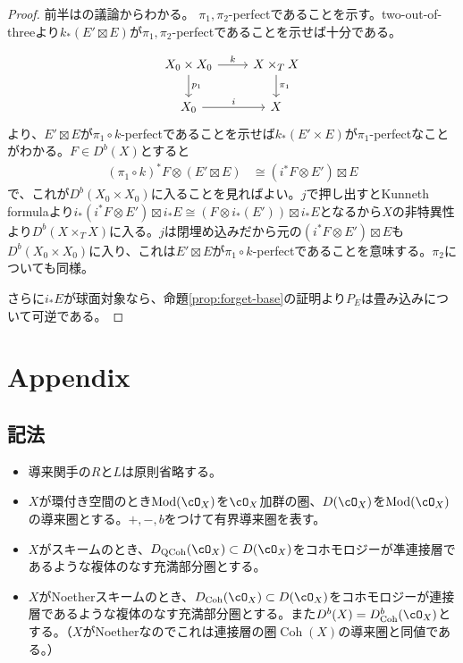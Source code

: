 \documentclass[uplatex, a4paper, dvipdfmx]{jsarticle}
\theoremstyle{definition}
\DeclareMathOperator{\Coh}{\mathrm{Coh}}
\DeclareMathOperator{\QCoh}{\mathrm{QCoh}}
\DeclareMathOperator{\Mod}{\mathrm{Mod}}
\begin{document}
\begin{proof}
    前半は\cite{2023arXiv230212501A}の議論からわかる。
    $\pi_1, \pi_2$-perfectであることを示す。two-out-of-threeより$k_*(E' \boxtimes E)$が$\pi_1, \pi_2$-perfectであることを示せば十分である。

    \[
        \begin{tikzcd}
            X_0 \times X_0 \arrow[r, "k"]\arrow[d, "p_1"] & X \times_T X\arrow[d, "\pi_1"]\\
            X_0 \arrow[r, "i"] & X
        \end{tikzcd}
    \]
    \cite[Proposition 2.7]{MR3720794}より、$E' \boxtimes E$が$\pi_1 \circ k$-perfectであることを示せば$k_*(E' \times E)$が$\pi_1$-perfectなことがわかる。$F \in D^b(X)$とすると
    \begin{align}
        (\pi_1 \circ k)^*F \otimes (E' \boxtimes E) & \cong (i^*F \otimes E') \boxtimes E
    \end{align}
    で、これが$D^b(X_0 \times X_0)$に入ることを見ればよい。$j$で押し出すとKunneth formulaより$i_*(i^*F \otimes E') \boxtimes i_*E \cong (F \otimes i_*(E'))\boxtimes i_*E$となるから$X$の非特異性より$D^b(X \times_T X)$に入る。$j$は閉埋め込みだから元の$(i^*F \otimes E') \boxtimes E$も$D^b(X_0 \times X_0)$に入り、これは$E' \boxtimes E$が$\pi_1 \circ k$-perfectであることを意味する。$\pi_2$についても同様。

    さらに$i_*E$が球面対象なら、命題\ref{prop:forget-base}の証明より$P_E$は畳み込みについて可逆である。
\end{proof}

\section{Appendix}
\subsection{記法}
\begin{itemize}
    \item 導来関手の$R$と$L$は原則省略する。
    \item $X$が環付き空間のとき$\Mod(\cO_X)$を$\cO_X$加群の圏、$D(\cO_X)$を$\Mod(\cO_X)$の導来圏とする。$+, -, b$をつけて有界導来圏を表す。
    \item $X$がスキームのとき、$D_{\QCoh}(\cO_X) \subset D(\cO_X)$をコホモロジーが凖連接層であるような複体のなす充満部分圏とする。
    \item $X$がNoetherスキームのとき、$D_{\Coh}(\cO_X) \subset D(\cO_X)$をコホモロジーが連接層であるような複体のなす充満部分圏とする。また$D^b(X) = D_{\Coh}^b(\cO_X)$とする。（$X$がNoetherなのでこれは連接層の圏$\Coh(X)$の導来圏と同値である。）
\end{itemize}
\end{document}
